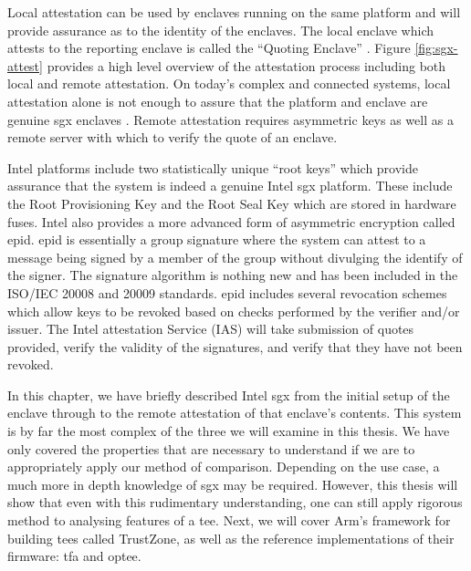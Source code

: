 Local \gls{attestation} can be used by enclaves running on the same platform and will provide assurance as to the identity of the enclaves. The local enclave which attests to the reporting enclave is called the ``Quoting Enclave'' \cite{johnson2016intel}. Figure \ref{fig:sgx-attest} provides a high level overview of the \gls{attestation} process including both local and remote \gls{attestation}. On today's complex and connected systems, local \gls{attestation} alone is not enough to assure that the platform and enclave are genuine \gls{sgx} enclaves \cite{knauth2018integrating}. Remote \gls{attestation} requires asymmetric keys as well as a remote server with which to verify the quote of an enclave.

Intel platforms include two statistically unique ``root keys'' which provide assurance that the system is indeed a genuine Intel \gls{sgx} platform. These include the Root Provisioning Key and the Root Seal Key \cite{johnson2016intel} which are stored in hardware fuses. Intel also provides a more advanced form of asymmetric encryption called \gls{epid}. \gls{epid} is essentially a group signature where the system can attest to a message being signed by a member of the group without divulging the identify of the signer. The signature algorithm is nothing new \cite{brickell2007enhanced} and has been included in the ISO/IEC 20008 and 20009 standards. \gls{epid} includes several revocation schemes which allow keys to be revoked based on checks performed by the verifier and/or issuer. The Intel \Gls{attestation} Service (IAS) will take submission of quotes provided, verify the validity of the signatures, and verify that they have not been revoked.

In this chapter, we have briefly described Intel \gls{sgx} from the initial setup of the enclave through to the remote \gls{attestation} of that enclave's contents. This system is by far the most complex of the three we will examine in this thesis. We have only covered the properties that are necessary to understand if we are to appropriately apply our method of comparison. Depending on the use case, a much more in depth knowledge of \gls{sgx} may be required. However, this thesis will show that even with this rudimentary understanding, one can still apply rigorous method to analysing features of a \gls{tee}. Next, we will cover Arm's framework for building \glspl{tee} called TrustZone, as well as the reference implementations of their firmware: \gls{tfa} and \gls{optee}.
